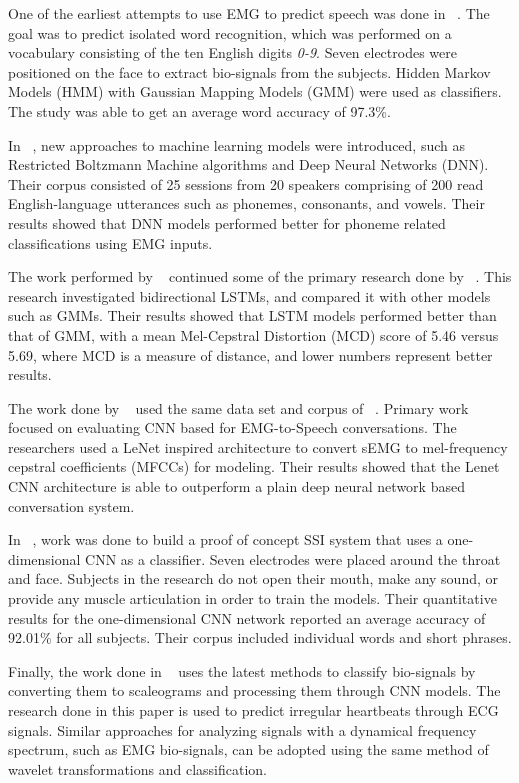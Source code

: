 \documentclass{article}
\begin{document}
One of the earliest attempts to use EMG to predict speech was done in ~\cite{maier-hein_session_2005}. The goal was to predict isolated word recognition, which was performed on a vocabulary consisting of the ten English digits \textit{0-9}. Seven electrodes were positioned on the face to extract bio-signals from the subjects. Hidden Markov Models (HMM) with Gaussian Mapping Models (GMM) were used as classifiers. The study was able to get an average word accuracy of 97.3\%. 

In ~\cite{wand_pattern_2014}, new approaches to  machine learning models were introduced, such as Restricted Boltzmann Machine algorithms and Deep Neural Networks (DNN). Their corpus consisted of 25 sessions from 20 speakers comprising of 200 read English-language utterances such as phonemes, consonants, and vowels. Their results showed that DNN models performed better for phoneme related classifications using EMG inputs. 

The work performed by ~\cite{janke_emg--speech:_2017} continued some of the primary research done by ~\cite{wand_pattern_2014}. This research investigated bidirectional LSTMs, and compared it with other models such as GMMs. Their results showed that LSTM models performed better than that of GMM, with a mean Mel-Cepstral Distortion (MCD) score of 5.46 versus 5.69, where MCD is a measure of distance, and lower numbers represent better results.

The work done by ~\cite{diener_session-independent_nodate} used the same data set and corpus of ~\cite{janke_emg--speech:_2017}. Primary work focused on evaluating CNN based for EMG-to-Speech conversations. The researchers used a LeNet inspired architecture to convert sEMG  to mel-frequency cepstral coefficients (MFCCs) for modeling. Their results showed that the Lenet CNN architecture is able to outperform a plain deep neural network based conversation system. 

In ~\cite{kapur_alterego:_2018}, work was done to build a proof of concept SSI system that uses a one-dimensional CNN as a classifier. Seven electrodes were placed around the throat and face.  Subjects in the research do not open their mouth, make any sound, or provide any muscle articulation in order to train the models. Their quantitative results for the one-dimensional CNN network reported an average accuracy of 92.01\% for all subjects. Their corpus included individual words and short phrases.

Finally, the work done in ~\cite{noauthor_classify_nodate} uses the latest methods to classify bio-signals by converting them to scaleograms and processing them through CNN models. The research done in this paper is used to predict irregular heartbeats through ECG signals. Similar approaches for analyzing signals with a dynamical frequency spectrum, such as EMG bio-signals, can be adopted using the same method of wavelet transformations and classification. 
\end{document}
